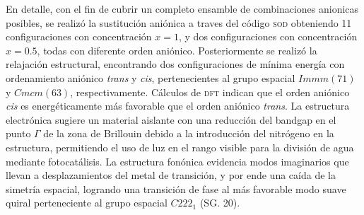 {\begin{description}
  En detalle, con el fin de cubrir un completo ensamble de combinaciones anionicas posibles, se realizó la sustitución aniónica a traves del código \textsc{sod} obteniendo 11 configuraciones con concentración $x=1$, y dos configuraciones con concentración $x=0.5$, todas con diferente orden aniónico. 
  Posteriormente se realizó la relajación estructural, encontrando dos configuraciones de mínima energía con ordenamiento aniónico \emph{trans} y \emph{cis}, pertenecientes al grupo espacial $Immm(71)$ y $Cmcm(63)$, respectivamente. 
  Cálculos de \textsc{dft} indican que el orden aniónico \emph{cis} es energéticamente más favorable que el orden aniónico \emph{trans}. 
  La estructura electrónica sugiere un material aislante con una reducción del bandgap en el punto $\Gamma$ de la zona de Brillouin debido a la introducción del nitrógeno en la estructura, permitiendo el uso de luz en el rango visible para la división de agua mediante fotocatálisis. 
  La estructura fonónica evidencia modos imaginarios que llevan a desplazamientos del metal de transición, y por ende una caída de la simetría espacial, logrando una transición de fase al más favorable modo suave quiral perteneciente al grupo espacial $C222_{1}$ (SG. 20).

\end{description}}\normalsize
